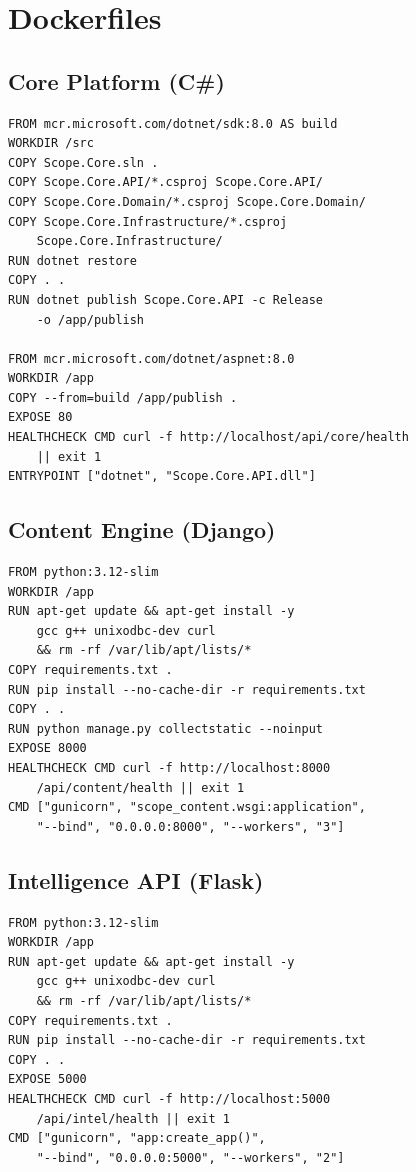 \documentclass[12pt,letterpaper]{article}
\begin{document}
\newpage

\section{Dockerfiles}

\subsection{Core Platform (C\#)}
\begin{lstlisting}[style=code]
FROM mcr.microsoft.com/dotnet/sdk:8.0 AS build
WORKDIR /src
COPY Scope.Core.sln .
COPY Scope.Core.API/*.csproj Scope.Core.API/
COPY Scope.Core.Domain/*.csproj Scope.Core.Domain/
COPY Scope.Core.Infrastructure/*.csproj
    Scope.Core.Infrastructure/
RUN dotnet restore
COPY . .
RUN dotnet publish Scope.Core.API -c Release
    -o /app/publish

FROM mcr.microsoft.com/dotnet/aspnet:8.0
WORKDIR /app
COPY --from=build /app/publish .
EXPOSE 80
HEALTHCHECK CMD curl -f http://localhost/api/core/health
    || exit 1
ENTRYPOINT ["dotnet", "Scope.Core.API.dll"]
\end{lstlisting}

\subsection{Content Engine (Django)}
\begin{lstlisting}[style=code]
FROM python:3.12-slim
WORKDIR /app
RUN apt-get update && apt-get install -y
    gcc g++ unixodbc-dev curl
    && rm -rf /var/lib/apt/lists/*
COPY requirements.txt .
RUN pip install --no-cache-dir -r requirements.txt
COPY . .
RUN python manage.py collectstatic --noinput
EXPOSE 8000
HEALTHCHECK CMD curl -f http://localhost:8000
    /api/content/health || exit 1
CMD ["gunicorn", "scope_content.wsgi:application",
    "--bind", "0.0.0.0:8000", "--workers", "3"]
\end{lstlisting}

\subsection{Intelligence API (Flask)}
\begin{lstlisting}[style=code]
FROM python:3.12-slim
WORKDIR /app
RUN apt-get update && apt-get install -y
    gcc g++ unixodbc-dev curl
    && rm -rf /var/lib/apt/lists/*
COPY requirements.txt .
RUN pip install --no-cache-dir -r requirements.txt
COPY . .
EXPOSE 5000
HEALTHCHECK CMD curl -f http://localhost:5000
    /api/intel/health || exit 1
CMD ["gunicorn", "app:create_app()",
    "--bind", "0.0.0.0:5000", "--workers", "2"]
\end{lstlisting}
\end{document}
